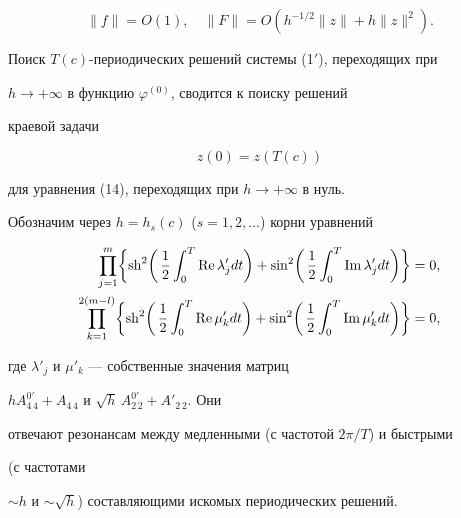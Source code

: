 \begin{pf}
$$ 


\|f\|=O(1),\quad \|F\|=O(h^{-1/2}\|z\|+h\|z\|^2). 


$$ 


Поиск $T(c)$-периодических решений системы (1${}'$), переходящих при 


$h\to+\infty$ в функцию $\varphi^{(0)}$, сводится к поиску решений 


краевой задачи 


\begin{equation} 


z(0)=z(T(c)) 


\end{equation} 


для уравнения (14), переходящих при $h\to+\infty$ в нуль. 


 


Обозначим через $h=h_s(c)$ ($s=1,2,\dotsc$) корни уравнений 


\begin{equation} 


\begin{split} 


\prod^m_{j=1}\biggl\{\sh^2\biggl(\,\frac{1}{2}\int^T_0 


\re\lambda'_j dt\biggr)+\sin^2 


\biggl(\,\frac{1}{2}\int^T_0\im\lambda'_j dt\biggr) 


\biggr\} &=0, \\ 


% 


\prod^{2(m-l)}_{k=1}\biggl\{\sh^2\biggl(\,\frac{1}{2}\int^T_0 


\re\mu'_k dt\biggr)+\sin^2 


\biggl(\,\frac{1}{2}\int^T_0\im\mu'_k dt\biggr) 


\biggr\} &=0, 


\end{split} 


\end{equation} 


где $\lambda'_j$ и $\mu'_k$ --- собственные значения матриц 


$h A^{0'}_{4\,4}+A_{4\,4}$ и $\sqrt{h}\,A^{0'}_{2\,2}+A'_{2\,2}$. Они 


отвечают резонансам между медленными (с частотой $2\pi/T$) и быстрыми


(с частотами 


$\sim h$ и $\sim\sqrt{h}$) составляющими искомых периодических решений. 



\end{pf}
